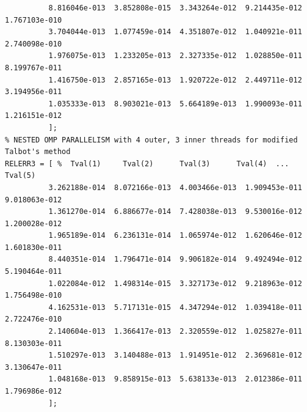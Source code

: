 \documentclass[a4paper,10pt]{report}%
\begin{document}
\begin{lstlisting}
          8.816046e-013  3.852808e-015  3.343264e-012  9.214435e-012  1.767103e-010
          3.704044e-013  1.077459e-014  4.351807e-012  1.040921e-011  2.740098e-010
          1.976075e-013  1.233205e-013  2.327335e-012  1.028850e-011  8.199767e-011
          1.416750e-013  2.857165e-013  1.920722e-012  2.449711e-012  3.194956e-011
          1.035333e-013  8.903021e-013  5.664189e-013  1.990093e-011  1.216151e-012
          ];
% NESTED OMP PARALLELISM with 4 outer, 3 inner threads for modified Talbot's method
RELERR3 = [ %  Tval(1)     Tval(2)      Tval(3)      Tval(4)  ... Tval(5)
          3.262188e-014  8.072166e-013  4.003466e-013  1.909453e-011  9.018063e-012
          1.361270e-014  6.886677e-014  7.428038e-013  9.530016e-012  1.200028e-012
          1.965189e-014  6.236131e-014  1.065974e-012  1.620646e-012  1.601830e-011
          8.440351e-014  1.796471e-014  9.906182e-014  9.492494e-012  5.190464e-011
          1.022084e-012  1.498314e-015  3.327173e-012  9.218963e-012  1.756498e-010
          4.162531e-013  5.717131e-015  4.347294e-012  1.039418e-011  2.722476e-010
          2.140604e-013  1.366417e-013  2.320559e-012  1.025827e-011  8.130303e-011
          1.510297e-013  3.140488e-013  1.914951e-012  2.369681e-012  3.130647e-011
          1.048168e-013  9.858915e-013  5.638133e-013  2.012386e-011  1.796986e-012
          ];
\end{lstlisting}
\end{document}
